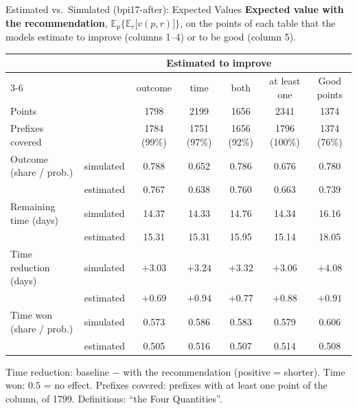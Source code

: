 \documentclass[aspectratio=169]{beamer} %
\begin{document}
\begin{frame}{Estimated vs.\ Simulated (bpi17-after): Expected Values}
  \scriptsize\setlength{\aboverulesep}{0pt}\setlength{\belowrulesep}{1pt}
  \textbf{Expected value with the recommendation}, $\mathbb{E}_p\big\{\mathbb{E}_r\big[v(p,r)\big]\big\}$,
  on the points of each table that the models estimate to improve (columns 1--4) or to be good (column 5).
  \begin{center}\setlength{\tabcolsep}{3pt}
  \begin{tabular}{ll ccccc}
    \toprule
     & & \multicolumn{4}{c}{Estimated to improve} & \\
    \cmidrule(lr){3-6}
     & & outcome & time & both & at least one & Good points \\
    \midrule
    Points & & 1798 & 2199 & 1656 & 2341 & 1374 \\
    Prefixes covered & & 1784 (99\%) & 1751 (97\%) & 1656 (92\%) & 1796 (100\%) & 1374 (76\%) \\
    \midrule
    Outcome (share / prob.) & simulated & 0.788 & 0.652 & 0.786 & 0.676 & 0.780 \\
     & estimated & 0.767 & 0.638 & 0.760 & 0.663 & 0.739 \\
    \addlinespace[2pt]
    Remaining time (days) & simulated & 14.37 & 14.33 & 14.76 & 14.34 & 16.16 \\
     & estimated & 15.31 & 15.31 & 15.95 & 15.14 & 18.05 \\
    \addlinespace[2pt]
    Time reduction (days) & simulated & $+3.03$ & $+3.24$ & $+3.32$ & $+3.06$ & $+4.08$ \\
     & estimated & $+0.69$ & $+0.94$ & $+0.77$ & $+0.88$ & $+0.91$ \\
    \addlinespace[2pt]
    Time won (share / prob.) & simulated & 0.573 & 0.586 & 0.583 & 0.579 & 0.606 \\
     & estimated & 0.505 & 0.516 & 0.507 & 0.514 & 0.508 \\
    \bottomrule
  \end{tabular}
  \end{center}
  {\tiny Time reduction: baseline $-$ with the recommendation (positive = shorter). Time won: $0.5$ = no effect.
  Prefixes covered: prefixes with at least one point of the column, of 1799. Definitions: ``the Four Quantities''.}
\end{frame}
\end{document}
